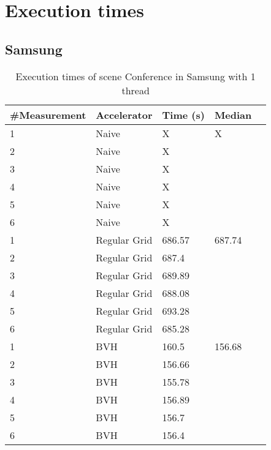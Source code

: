 \section{Execution times}

\subsection{Samsung}

\par

\begin{table}[H]
	\small
	\begin{tabular}{|l|l|l|l|l|}
		\hline
		\#Measurement & Accelerator & Time (s) & Median \\ \hline
		1 & Naive & X & X \\ \hline
		2 & Naive & X & \\ \hline
		3 & Naive & X & \\ \hline
		4 & Naive & X & \\ \hline
		5 & Naive & X & \\ \hline
		6 & Naive & X & \\ \hline
		1 & Regular Grid & 686.57 & 687.74 \\ \hline
		2 & Regular Grid & 687.4 & \\ \hline
		3 & Regular Grid & 689.89 & \\ \hline
		4 & Regular Grid & 688.08 & \\ \hline
		5 & Regular Grid & 693.28 & \\ \hline
		6 & Regular Grid & 685.28 & \\ \hline
		1 & BVH & 160.5 & 156.68 \\ \hline
		2 & BVH & 156.66 & \\ \hline
		3 & BVH & 155.78 & \\ \hline
		4 & BVH & 156.89 & \\ \hline
		5 & BVH & 156.7 & \\ \hline
		6 & BVH & 156.4 & \\ \hline
	\end{tabular}
	\label{Time}
	\caption{Execution times of scene Conference in Samsung with 1 thread}
\end{table}

